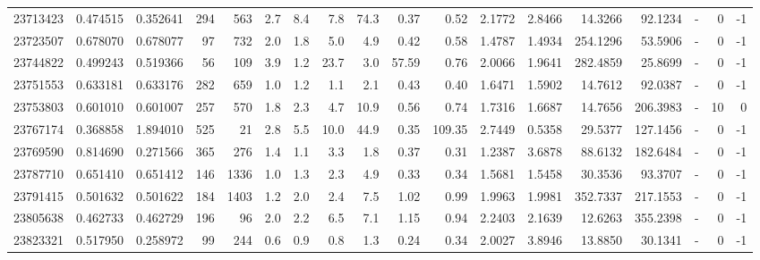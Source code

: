 \begin{tabular}{rrrrrrrrrrrrrrrlrr}
  23713423 & 0.474515 &   0.352641 &  294 &  563 &      2.7 &      8.4 &     7.8 &     74.3 &       0.37 &        0.52 &  2.1772 &  2.8466 &   14.3266 &   92.1234 &             - &        0 &         -1 \\
  23723507 & 0.678070 &   0.678077 &   97 &  732 &      2.0 &      1.8 &     5.0 &      4.9 &       0.42 &        0.58 &  1.4787 &  1.4934 &  254.1296 &   53.5906 &             - &        0 &         -1 \\
  23744822 & 0.499243 &   0.519366 &   56 &  109 &      3.9 &      1.2 &    23.7 &      3.0 &      57.59 &        0.76 &  2.0066 &  1.9641 &  282.4859 &   25.8699 &             - &        0 &         -1 \\
  23751553 & 0.633181 &   0.633176 &  282 &  659 &      1.0 &      1.2 &     1.1 &      2.1 &       0.43 &        0.40 &  1.6471 &  1.5902 &   14.7612 &   92.0387 &             - &        0 &         -1 \\
  23753803 & 0.601010 &   0.601007 &  257 &  570 &      1.8 &      2.3 &     4.7 &     10.9 &       0.56 &        0.74 &  1.7316 &  1.6687 &   14.7656 &  206.3983 &             - &       10 &          0 \\
  23767174 & 0.368858 &   1.894010 &  525 &   21 &      2.8 &      5.5 &    10.0 &     44.9 &       0.35 &      109.35 &  2.7449 &  0.5358 &   29.5377 &  127.1456 &             - &        0 &         -1 \\
  23769590 & 0.814690 &   0.271566 &  365 &  276 &      1.4 &      1.1 &     3.3 &      1.8 &       0.37 &        0.31 &  1.2387 &  3.6878 &   88.6132 &  182.6484 &             - &        0 &         -1 \\
  23787710 & 0.651410 &   0.651412 &  146 & 1336 &      1.0 &      1.3 &     2.3 &      4.9 &       0.33 &        0.34 &  1.5681 &  1.5458 &   30.3536 &   93.3707 &             - &        0 &         -1 \\
  23791415 & 0.501632 &   0.501622 &  184 & 1403 &      1.2 &      2.0 &     2.4 &      7.5 &       1.02 &        0.99 &  1.9963 &  1.9981 &  352.7337 &  217.1553 &             - &        0 &         -1 \\
  23805638 & 0.462733 &   0.462729 &  196 &   96 &      2.0 &      2.2 &     6.5 &      7.1 &       1.15 &        0.94 &  2.2403 &  2.1639 &   12.6263 &  355.2398 &             - &        0 &         -1 \\
  23823321 & 0.517950 &   0.258972 &   99 &  244 &      0.6 &      0.9 &     0.8 &      1.3 &       0.24 &        0.34 &  2.0027 &  3.8946 &   13.8850 &   30.1341 &             - &        0 &         -1 \\

\end{tabular}
